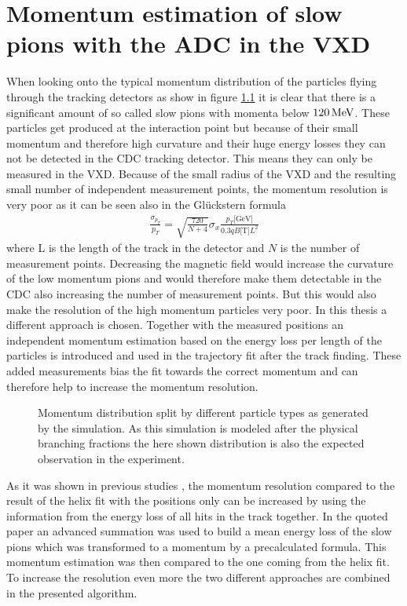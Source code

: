 \newcommand{\dedx}{$\mathrm d E / \mathrm d x$ }
\chapter{Momentum estimation of slow pions with the ADC in the VXD}

When looking onto the typical momentum distribution of the particles flying through the tracking detectors as show in figure \ref{fig-particles-momentum} it is clear that there is a significant amount of so called slow pions with momenta below $\unit[120]{MeV}$. These particles get produced at the interaction point but because of their small momentum and therefore high curvature and their huge energy losses they can not be detected in the CDC tracking detector. This means they can only be measured in the VXD. Because of the small radius of the VXD and the resulting small number of independent measurement points, the momentum resolution is very poor as it can be seen also in the Glückstern formula
\begin{align*}
 \frac{\sigma_{p_T}}{p_T} = \sqrt{\frac{720}{N + 4}} \sigma_x \frac{p_T \text{[GeV]}}{0.3 q B \text{[T]} L^2}
\end{align*}
where L is the length of the track in the detector and $N$ is the number of measurement points. Decreasing the magnetic field would increase the curvature of the low momentum pions and would therefore make them detectable in the CDC also increasing the number of measurement points. But this would also make the resolution of the high momentum particles very poor. In this thesis a different approach is chosen. Together with the measured positions an independent momentum estimation based on the energy loss per length of the particles is introduced and used in the trajectory fit after the track finding. These added measurements bias the fit towards the correct momentum and can therefore help to increase the momentum resolution.

\begin{figure}
 \centering
 \caption{Momentum distribution split by different particle types as generated by the simulation. As this simulation is modeled after the physical branching fractions the here shown distribution is also the expected observation in the experiment.}
 \label{fig-particles-momentum}
\end{figure}

As it was shown in previous studies \cite{robert}, the momentum resolution compared to the result of the helix fit with the positions only can be increased by using the information from the energy loss of all hits in the track together. In the quoted paper an advanced summation was used to build a mean energy loss of the slow pions which was transformed to a momentum by a precalculated formula. This momentum estimation was then compared to the one coming from the helix fit. To increase the resolution even more the two different approaches are combined in the presented algorithm.

